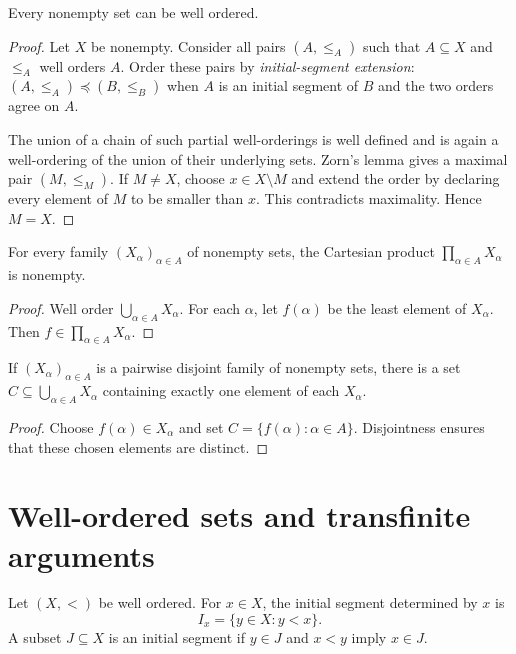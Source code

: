 \begin{thm}
Every nonempty set can be well ordered.
\end{thm}

\begin{proof}
Let $X$ be nonempty. Consider all pairs $(A,\leq_A)$ such that $A\subseteq X$ and $\leq_A$ well orders $A$. Order these pairs by \emph{initial-segment extension}: $(A,\leq_A)\preccurlyeq(B,\leq_B)$ when $A$ is an initial segment of $B$ and the two orders agree on $A$.

The union of a chain of such partial well-orderings is well defined and is again a well-ordering of the union of their underlying sets. Zorn's lemma gives a maximal pair $(M,\leq_M)$. If $M\neq X$, choose $x\in X\setminus M$ and extend the order by declaring every element of $M$ to be smaller than $x$. This contradicts maximality. Hence $M=X$.
\end{proof}

\begin{thm}
For every family $(X_\alpha)_{\alpha\in A}$ of nonempty sets, the Cartesian product $\prod_{\alpha\in A}X_\alpha$ is nonempty.
\end{thm}

\begin{proof}
Well order $\bigcup_{\alpha\in A}X_\alpha$. For each $\alpha$, let $f(\alpha)$ be the least element of $X_\alpha$. Then $f\in\prod_{\alpha\in A}X_\alpha$.
\end{proof}

\begin{cor}
If $(X_\alpha)_{\alpha\in A}$ is a pairwise disjoint family of nonempty sets, there is a set $C\subseteq\bigcup_{\alpha\in A}X_\alpha$ containing exactly one element of each $X_\alpha$.
\end{cor}

\begin{proof}
Choose $f(\alpha)\in X_\alpha$ and set $C=\{f(\alpha):\alpha\in A\}$. Disjointness ensures that these chosen elements are distinct.
\end{proof}

\section{Well-ordered sets and transfinite arguments}

\begin{de}
Let $(X,<)$ be well ordered. For $x\in X$, the initial segment determined by $x$ is
\[
I_x=\{y\in X:y<x\}.
\]
A subset $J\subseteq X$ is an initial segment if $y\in J$ and $x<y$ imply $x\in J$.
\end{de}

